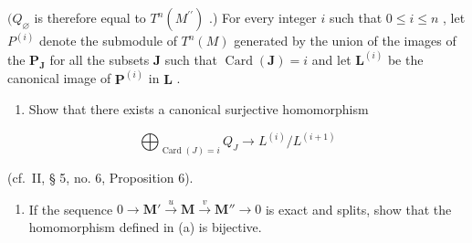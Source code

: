 \((Q_{\varnothing}\) is therefore equal to \(T^{n}(M^{\prime \prime})\) .) For every integer \(i\) such that \(0 \leqslant i \leqslant n\) , let \(P^{(i)}\) denote the submodule of \(T^{n}(M)\) generated by the union of the images of the \(\mathbf{P}_{\mathbf{J}}\) for all the subsets \(\mathbf{J}\) such that \(\operatorname{Card}(\mathbf{J}) = i\) and let \(\mathbf{L}^{(i)}\) be the canonical image of \(\mathbf{P}^{(i)}\) in \(\mathbf{L}\) .

\begin{enumerate}
\def\labelenumi{(\alph{enumi})}
\tightlist
\item
  Show that there exists a canonical surjective homomorphism
\end{enumerate}

\[
\bigoplus_ {\operatorname{Card} (J) = i} Q _ {J} \rightarrow L ^ {(i)} / L ^ {(i + 1)}
\]

(cf.~II, § 5, no. 6, Proposition 6).

\begin{enumerate}
\def\labelenumi{(\alph{enumi})}
\setcounter{enumi}{1}
\tightlist
\item
  If the sequence \(0 \to \mathbf{M}' \xrightarrow{u} \mathbf{M} \xrightarrow{v} \mathbf{M}'' \to 0\) is exact and splits, show that the homomorphism defined in (a) is bijective.
\end{enumerate}

